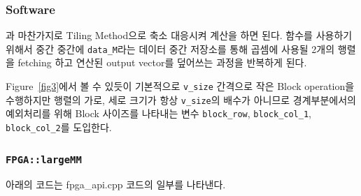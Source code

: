\documentclass{article}
\begin{document}
\subsubsection{Software}
과 마찬가지로 Tiling Method으로 축소 대응시켜 계산을 하면 된다. 함수를 사용하기 위해서 중간 중간에 \texttt{data\_M}라는 데이터 중간 저장소를 통해 곱셈에 사용될 2개의 행렬을 fetching 하고 연산된 output vector를 덮어쓰는 과정을 반복하게 된다.

Figure~\ref{fig3}에서 볼 수 있듯이 기본적으로 \texttt{v\_size} 간격으로 작은 Block operation을 수행하지만 행렬의 가로, 세로 크기가 항상 \texttt{v\_size}의 배수가 아니므로 경계부분에서의 예외처리를 위해 Block 사이즈를 나타내는 변수 \texttt{block\_row},  \texttt{block\_col\_1}, \texttt{block\_col\_2}를 도입한다.

\subsubsection*{\texttt{FPGA::largeMM}}
아래의 코드는 fpga\_api.cpp 코드의 일부를 나타낸다.\\
\end{document}
